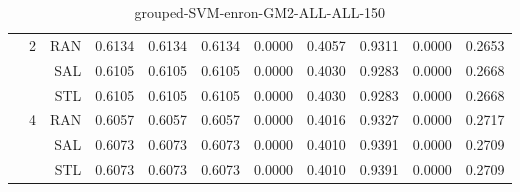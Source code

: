 \begin{center}
\begin{table}[htbp]
\begin{center}
\begin{tabular}{ | r | r | r | r | r | r | r | r | r | r | r |}
 & \multirow{3}{*}{2} & RAN & 0.6134 & 0.6134 & 0.6134 & 0.0000 & 0.4057 & 0.9311 & 0.0000 & 0.2653\\ \cline{3-11}
 &   & SAL & 0.6105 & 0.6105 & 0.6105 & 0.0000 & 0.4030 & 0.9283 & 0.0000 & 0.2668\\ \cline{3-11}
 &   & STL & 0.6105 & 0.6105 & 0.6105 & 0.0000 & 0.4030 & 0.9283 & 0.0000 & 0.2668\\ \cline{2-11}
 & \multirow{3}{*}{4} & RAN & 0.6057 & 0.6057 & 0.6057 & 0.0000 & 0.4016 & 0.9327 & 0.0000 & 0.2717\\ \cline{3-11}
 &   & SAL & 0.6073 & 0.6073 & 0.6073 & 0.0000 & 0.4010 & 0.9391 & 0.0000 & 0.2709\\ \cline{3-11}
 &   & STL & 0.6073 & 0.6073 & 0.6073 & 0.0000 & 0.4010 & 0.9391 & 0.0000 & 0.2709\\ \cline{2-11}
\hline
\end{tabular}
\caption{grouped-SVM-enron-GM2-ALL-ALL-150}
\end{center}
 \end{table}
\end{center}

